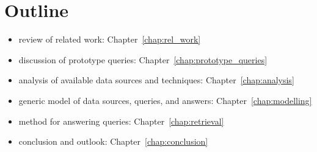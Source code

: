 \section{Outline}
\label{sec:outline}

\begin{itemize}
  \item
    review of related work: Chapter~\ref{chap:rel_work}
  \item
    discussion of prototype queries: Chapter~\ref{chap:prototype_queries}
  \item
    analysis of available data sources and techniques: Chapter~\ref{chap:analysis}
  \item
    generic model of data sources, queries, and answers: Chapter~\ref{chap:modelling}
  \item
    method for answering queries: Chapter~\ref{chap:retrieval}
  \item
    conclusion and outlook: Chapter~\ref{chap:conclusion}
\end{itemize}


